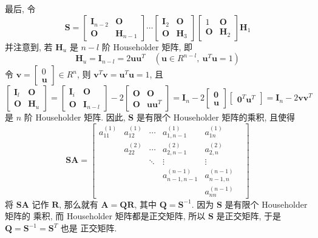 \par 最后, 令
$$
    \bm{S} = \begin{bmatrix}
        \bm{I}_{n-2} & \bm{O}       \\
        \bm{O}       & \bm{H}_{n-1}
    \end{bmatrix} \cdots \begin{bmatrix}
        \bm{I}_2 & \bm{O}   \\
        \bm{O}   & \bm{H}_3
    \end{bmatrix} \begin{bmatrix}
        1      & \bm{O}   \\
        \bm{O} & \bm{H}_2
    \end{bmatrix} \bm{H}_1
$$
并注意到, 若 $\bm{H}_u$ 是 $n-l$ 阶 Householder 矩阵, 即
$$
    \bm{H}_u = \bm{I}_{n-l} = 2\bm{uu}^T \quad (\bm{u} \in R^{n-l}, \ \bm{u}^T\bm{u} = 1)
$$
令 $\bm{v} = \begin{bmatrix}
        0 \\
        \bm{u}
    \end{bmatrix} \in R^n$, 则 $\bm{v}^T\bm{v} = \bm{u}^T\bm{u} = 1$, 且
$$
    \begin{bmatrix}
        \bm{I}_l & \bm{O}   \\
        \bm{O}   & \bm{H}_u
    \end{bmatrix} = \begin{bmatrix}
        \bm{I}_i & \bm{O}       \\
        \bm{O}   & \bm{I}_{n-l}
    \end{bmatrix} - 2 \begin{bmatrix}
        \bm{O} & \bm{O}    \\
        \bm{O} & \bm{uu}^T
    \end{bmatrix} = \bm{I}_n - 2\begin{bmatrix}
        \bm{0} \\
        \bm{u}
    \end{bmatrix} \begin{bmatrix}
        \bm{0}^T \bm{u}^T
    \end{bmatrix} = \bm{I}_n - 2\bm{vv}^T
$$
是 $n$ 阶 Householder 矩阵. 因此, $\bm{S}$ 是有限个 Householder 矩阵的乘积, 且使得
$$
    \bm{SA} = \begin{bmatrix}
        a_{11}^{(1)} & a_{12}^{(1)} & \cdots & a_{1,n-1}^{(1)}          & a_{1n}^{(1)}        \\
                     & a_{22}^{(2)} & \cdots & a_{2, n-1}^{(2)}         & a_{2, n}^{(2)}      \\
                     &              & \ddots & \vdots                   & \vdots            & \\
                     &              &        & a_{n - 1, n - 1}^{(n-1)} & a_{n-1,n}^{(n-1)}   \\
                     &              &        &                          & a_{nn}^{(n-1)}
    \end{bmatrix}
$$
将 $\bm{SA}$ 记作 $\bm{R}$, 那么就有 $\bm{A} = \bm{QR}$, 其中 $\bm{Q} = \bm{S}^{-1}$. 因为 $\bm{S}$ 是有限个 Householder 矩阵的
乘积, 而 Householder 矩阵都是正交矩阵, 所以 $\bm{S}$ 是正交矩阵, 于是 $\bm{Q} = \bm{S}^{-1} = \bm{S}^T$ 也是
正交矩阵.

